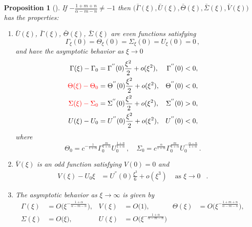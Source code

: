 \documentclass[a4paper,11pt]{article}
\def\red{\color{red}}
\def\bG{{\bar{\Gamma}}}
\def\bV{{\bar{V}}}
\def\bTh{{\bar{\Theta}}}
\def\bS{{\bar{\Sigma}}}
\def\bU{{\bar{U}}}
\def\BO{{{O}}}
\newtheorem{proposition}{Proposition}[section]
\theoremstyle{remark}
\begin{document}
\begin{proposition}[\cite{LKT17}] \label{mainthm2}
If $-\frac{1+m+n}{\alpha-m-n}\ne-1$ then 
$\big(\bG(\xi), \bU(\xi), \bTh(\xi),\bS(\xi),\bV(\xi)\big)$ has the  properties:

 \begin{enumerate}
  \item[(i)] $\bU (\xi)$, $\bG(\xi)$, $\bTh(\xi)$, $\bS(\xi)$ are even functions satisfying
    \begin{equation*}
    \Gamma_\xi(0) = \Theta_\xi(0)=\Sigma_\xi(0) = {U}_\xi(0)=0 \, ,
  \end{equation*}
and have the asymptotic behavior as $\xi \rightarrow 0$ 
  \begin{equation} \label{eq:ss_asymp0}
  \begin{aligned}
    \Gamma(\xi) -\Gamma_0 &= \Gamma^{''}(0)\frac{\xi^2}{2} + o(\xi^2), & \Gamma^{''}(0)&<0,\\
    \red \Theta(\xi) - \Theta_0 &= \Theta^{''}(0)\frac{\xi^2}{2} + o(\xi^2), & \Theta^{''}(0)&<0,\\
    \red \Sigma(\xi) - \Sigma_0  &= \Sigma^{''}(0)\frac{\xi^2}{2} + o(\xi^2), & \Sigma^{''}(0)&>0, \\
    U(\xi) - U_0 &= U^{''}(0)\frac{\xi^2}{2} + o(\xi^2), & U^{''}(0)&<0,
   \end{aligned}
  \end{equation}
where 
  $$
  \Theta_0  =  c^{-\frac{1}{1+\alpha}}\Gamma_0^{\frac{m}{1+\alpha}} U_0^{\frac{1+n}{1+\alpha}} \, , \quad 
  \Sigma_0 = c^{\frac{\alpha}{1+\alpha}}\Gamma_0^{\frac{m}{1+\alpha}} U_0^{-\frac{\alpha-n}{1+\alpha}} \, .
  $$


\item[(ii)] $\bV(\xi)$ is an odd function satisfying ${V}(0) = 0$ and 
 \begin{equation} \label{eq:ss_asymp1}
  \begin{aligned}
  V(\xi) - U_0\xi &= U^{''}(0)\frac{\xi^3}{6} + o(\xi^3)  \, \quad \mbox{as $\xi \to 0$ }\, .
  \end{aligned}
  \end{equation}


 \item[(iii)] The asymptotic behavior as $\xi \rightarrow \infty$ is given by
  \begin{equation} \label{eq:ss_asymp1}
  \begin{aligned}
    \Gamma(\xi) &= \BO\big(\xi^{-\frac{1+\alpha}{\alpha-m-n}}), & V(\xi) &= \BO\big(1), &    \Theta(\xi) &= \BO\big(\xi^{-\frac{1+m+n}{\alpha-m-n}}),\\
   \Sigma(\xi) &= \BO\big(\xi), &   U(\xi) &= \BO\big(\xi^{-\frac{1+\alpha}{\alpha-m-n}})
  \end{aligned}
  \end{equation}
 \end{enumerate}
\end{proposition}
\end{document}
